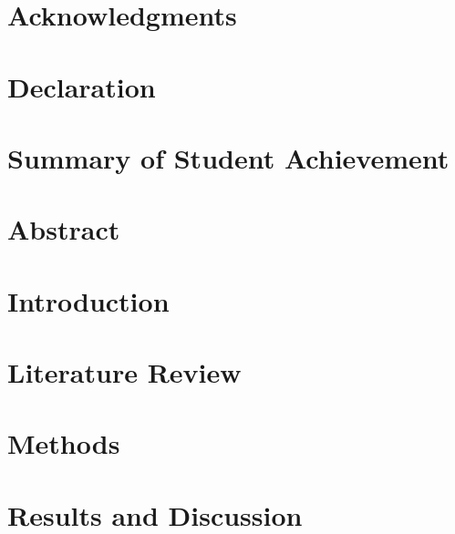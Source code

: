 \documentclass[12pt]{report}
\begin{document}

\restoregeometry

\chapter*{Acknowledgments}

\pagebreak

\chapter*{Declaration}

\pagebreak

\chapter*{Summary of Student Achievement}

\pagebreak

\listoffigures
\listoftables
\pagebreak

\justify

\chapter*{Abstract}

\pagebreak
\printglossaries

\setcounter{tocdepth}{5}
\tableofcontents
\pagebreak

\setcounter{page}{0}
\chapter{Introduction}


\chapter{Literature Review}


\chapter{Methods}


\chapter{Results and Discussion}\label{chap:results}

\end{document}
